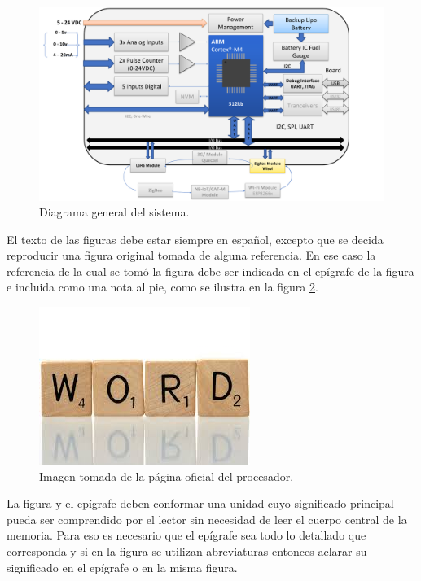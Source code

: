 \begin{figure}[h]
	\centering
	\includegraphics[scale=.35]{./Figures/esquemaGeneral.png}
	\caption{Diagrama general del sistema.}
	\label{fig:esquemaGeneral}
\end{figure}

El texto de las figuras debe estar siempre en español, excepto que se decida reproducir una figura original tomada de alguna referencia. En ese caso la referencia de la cual se tomó la figura debe ser indicada en el epígrafe de la figura e incluida como una nota al pie, como se ilustra en la figura \ref{fig:palabraIngles}.

\begin{figure}[h!]
	\centering
	\includegraphics[scale=.25]{./Figures/word.jpeg}
	\caption{Imagen tomada de la página oficial del procesador\protect\footnotemark.}
	\label{fig:palabraIngles}
\end{figure}



La figura y el epígrafe deben conformar una unidad cuyo significado principal pueda ser comprendido por el lector sin necesidad de leer el cuerpo central de la memoria. Para eso es necesario que el epígrafe sea todo lo detallado que corresponda y si en la figura se utilizan abreviaturas entonces aclarar su significado en el epígrafe o en la misma figura.

